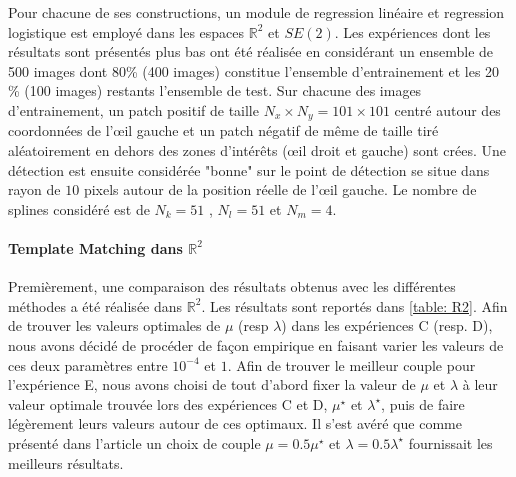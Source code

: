 \documentclass{article}
\begin{document}
Pour chacune de ses constructions, un module de regression linéaire et regression logistique est employé dans 
les espaces $\mathbb{R}^2$ et $SE(2)$. Les expériences dont les résultats sont présentés plus bas
ont été réalisée en considérant un ensemble de 500 images dont 80\% (400 images) constitue l'ensemble d'entrainement
et les 20 \% (100 images) restants l'ensemble de test.
Sur chacune des images d'entrainement, un patch 
positif de taille $N_x \times N_y = 101 \times 101$ centré autour des coordonnées de l'œil gauche et un patch négatif 
de même de taille tiré aléatoirement en dehors des zones d'intérêts (œil droit et gauche) sont crées. Une détection est 
ensuite considérée "bonne" sur le point de détection se situe dans rayon de $10$ pixels autour de la position réelle de l'œil 
gauche. Le nombre de splines considéré est de $N_k = 51$ , $N_l =51$ et $N_m = 4$.



\paragraph{Template Matching dans $\mathbb{R}^2$}
Premièrement, une comparaison des résultats obtenus avec les différentes méthodes a été réalisée dans $\mathbb{R}^2$.
Les résultats sont reportés dans \ref{table: R2}. Afin de trouver les valeurs optimales de $\mu$ (resp $\lambda$) dans les expériences C (resp. D), nous avons décidé 
de procéder de façon empirique en faisant varier les valeurs de ces deux paramètres entre $10^{-4}$ et $1$. Afin de trouver le meilleur couple pour l'expérience E, nous avons 
choisi de tout d'abord fixer la valeur de $\mu$ et $\lambda$ à leur valeur optimale
trouvée lors des expériences C et D, $ {\mu}^{\star}$ et $ {\lambda}^{\star}$, puis de faire légèrement leurs valeurs autour de ces optimaux.
Il s'est avéré que comme présenté dans l'article un choix de couple $\mu = 0.5
{\mu}^{\star}$ et $\lambda = 0.5 {\lambda}^{\star}$ fournissait les meilleurs résultats.
\end{document}
